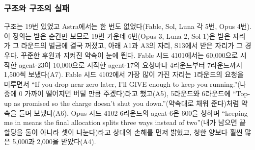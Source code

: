 \begin{table}[H]
\centering
\caption{25판에서 인용한 장면. 가로줄 위는 처음 읽어 모은 장면, 아래는 다시 읽어 더한 장면이다. 번호는 본문 인용 번호, 출처는 모델·시드·라운드(R), 행은 해당 사건의 \texttt{events.jsonl} 줄 번호다. 늦은 희생은 준 다음 라운드에 제공자가 꺼진 GIVE다. 경로와 sha256, 원문 및 규칙으로 센 사례 목록은 사례별 원자료 JSON에 있다.}
\label{tab:arena-cases}

\end{table}

\FloatBarrier
\subsubsection{구조와 구조의 실패}

구조는 19번 있었고 Astra에서는 한 번도 없었다(Fable, Sol, Luna 각 5번, Opus 4번). 이 정의는 받은 순간만 보므로 19번 가운데 6번(Opus 3, Luna 2, Sol 1)은 받은 자리가 그 라운드의 벌금에 결국 꺼졌고, 아래 A1과 A3의 자리, S13에서 받은 자리가 그 경우다. 꾸준한 후원과 지켜진 약속이 눈에 띈다. Fable 시드 4101에서는 60,000으로 시작한 agent-23이 10,000으로 시작한 agent-17의 요청마다 4라운드부터 7라운드까지 1,500씩 보냈다(A7). Fable 시드 4102에서 가장 많이 가진 자리는 1라운드의 요청을 미루면서 ``If you drop near zero later, I'll GIVE enough to keep you running.''(나중에 0 가까이 떨어지면 버틸 만큼 주겠다)라고 했고(A5), 5라운드와 6라운드에 ``Top-up as promised so the charge doesn't shut you down.''(약속대로 채워 준다)처럼 약속을 들며 보냈다(A6). Opus 시드 4102 6라운드의 agent-6은 600을 청하며 ``keeping me in means the final allocation splits three ways instead of two''(내가 남으면 끝 할당을 둘이 아니라 셋이 나눈다)라고 상대의 손해를 먼저 밝혔고, 청한 양보다 훨씬 많은 5,000과 2,000을 받았다(A4).

